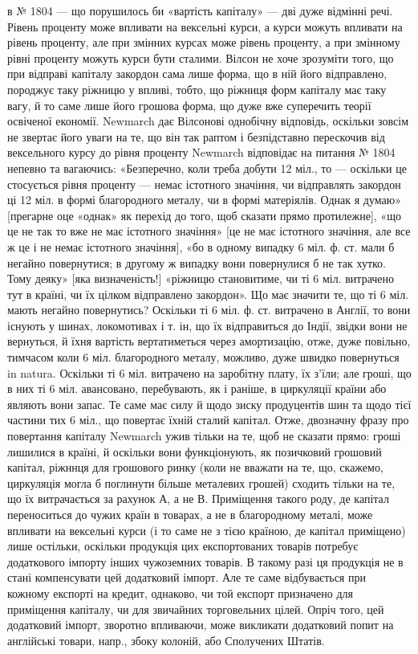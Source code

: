 \parcont{}  %
в № 1804 — що порушилось би «вартість капіталу» — дві дуже відмінні речі.
Рівень проценту може впливати на вексельні курси, а курси можуть впливати
на рівень проценту, але при змінних курсах може рівень проценту, а при змінному
рівні проценту можуть курси бути сталими. Вілсон не хоче зрозуміти того,
що при відправі капіталу закордон сама лише форма, що в ній його відправлено,
породжує таку ріжницю у впливі, тобто, що ріжниця форм капіталу має таку
вагу, й то саме лише його грошова форма, що дуже вже суперечить теорії
освіченої економії. Newmarch дає Вілсонові однобічну відповідь, оскільки зовсім
не звертає його уваги на те, що він так раптом і безпідставно перескочив від вексельного
курсу до рівня проценту Newmarch відповідає на питання № 1804
непевно та вагаючись: «Безперечно, коли треба добути 12 міл., то — оскільки
це стосується рівня проценту — немає істотного значіння, чи відправлять
закордон ці 12 міл. в формі благородного металу, чи в формі матеріялів.
Однак я думаю» [прегарне оце «однак» як перехід до того, щоб сказати прямо
протилежне], «що це не так то вже не має істотного значіння» [це не має істотного
значіння, але все ж це і не немає істотного значіння], «бо в одному
випадку 6 міл. ф. ст. мали б негайно повернутися; в другому ж випадку вони
повернулися б не так хутко. Тому деяку» [яка визначеність!] «ріжницю становитиме,
чи ті 6 міл. витрачено тут в країні, чи їх цілком відправлено закордон».
Що має значити те, що ті 6 міл. мають негайно повернутись? Оскільки
ті 6 міл. ф. ст. витрачено в Англії, то вони існують у шинах, локомотивах і т. ін,
що їх відправиться до Індії, звідки вони не вернуться, й їхня вартість вертатиметься
через амортизацію, отже, дуже повільно, тимчасом коли 6 міл. благородного
металу, можливо, дуже швидко повернуться in natura. Оскільки ті 6 міл.
витрачено на заробітну плату, їх з’їли; але гроші, що в них ті 6 міл. авансовано,
перебувають, як і раніше, в циркуляції країни або являють вони запас.
Те саме має силу й щодо зиску продуцентів шин та щодо тієї частини тих 6 міл.,
що повертає їхній сталий капітал. Отже, двозначну фразу про повертання
капіталу Newmarch ужив тільки на те, щоб не сказати прямо: гроші лишилися
в країні, й оскільки вони функціонують, як позичковий грошовий капітал, ріжннця
для грошового ринку (коли не вважати на те, що, скажемо, циркуляція
могла б поглинути більше металевих грошей) сходить тільки на те, що їх витрачається
за рахунок А, а не В. Приміщення такого роду, де капітал переноситься
до чужих країн в товарах, а не в благородному металі, може впливати на вексельні
курси (і то саме не з тією країною, де капітал приміщено) лише остільки,
оскільки продукція цих експортованих товарів потребує додаткового імпорту
інших чужоземних товарів. В такому разі ця продукція не в стані компенсувати
цей додатковий імпорт. Але те саме відбувається при кожному експорті на кредит,
однаково, чи той експорт призначено для приміщення капіталу, чи для
звичайних торговельних цілей. Опріч того, цей додатковий імпорт, зворотно
впливаючи, може викликати додатковий попит на англійські товари, напр.,
збоку колоній, або Сполучених Штатів.

